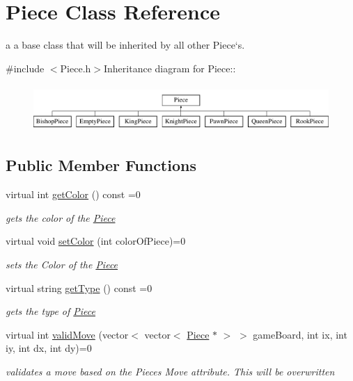 \hypertarget{classPiece}{
\section{Piece Class Reference}
\label{classPiece}
}


a a base class that will be inherited by all other Piece`s.  


{\ttfamily \#include $<$Piece.h$>$}Inheritance diagram for Piece::\begin{figure}[H]
\begin{center}
\leavevmode
\includegraphics[height=1.77778cm]{classPiece}
\end{center}
\end{figure}
\subsection*{Public Member Functions}
\begin{DoxyCompactItemize}
\item 
virtual int \hyperlink{classPiece_a1376072d4815719e60253ce5688df95c}{getColor} () const =0
\begin{DoxyCompactList}\small\item\em gets the color of the \hyperlink{classPiece}{Piece} \item\end{DoxyCompactList}\item 
virtual void \hyperlink{classPiece_a1387cb503dca308ac1e3bbe38a70a073}{setColor} (int colorOfPiece)=0
\begin{DoxyCompactList}\small\item\em sets the Color of the \hyperlink{classPiece}{Piece} \item\end{DoxyCompactList}\item 
virtual string \hyperlink{classPiece_a5b88fcd786bb30b345b24fbc3ab24ab9}{getType} () const =0
\begin{DoxyCompactList}\small\item\em gets the type of \hyperlink{classPiece}{Piece} \item\end{DoxyCompactList}\item 
virtual int \hyperlink{classPiece_a6bc81a2d7211e5a7972cec0a34ebb473}{validMove} (vector$<$ vector$<$ \hyperlink{classPiece}{Piece} $\ast$ $>$ $>$ gameBoard, int ix, int iy, int dx, int dy)=0
\begin{DoxyCompactList}\small\item\em validates a move based on the Pieces Move attribute. This will be overwritten \item\end{DoxyCompactList}\end{DoxyCompactItemize}


